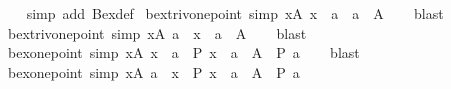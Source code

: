 \begin{isabellebody}
{}\isanewline
%
\isadelimproof
\ \ %
\endisadelimproof
%
\isatagproof
{}\isamarkupfalse%
\ {\isacharparenleft}{\kern0pt}simp\ add{\isacharcolon}{\kern0pt}\ Bex{\isacharunderscore}{\kern0pt}def{\isacharparenright}{\kern0pt}%
\endisatagproof
{\isafoldproof}%
%
\isadelimproof
\isanewline
%
\endisadelimproof
\isanewline
{}\isamarkupfalse%
\ bex{\isacharunderscore}{\kern0pt}triv{\isacharunderscore}{\kern0pt}one{\isacharunderscore}{\kern0pt}point{}\ {\isacharbrackleft}{\kern0pt}simp{\isacharbrackright}{\kern0pt}{\isacharcolon}{\kern0pt}\ {\isachardoublequoteopen}{\isacharparenleft}{\kern0pt}{\isasymexists}x{\isasymin}A{\isachardot}{\kern0pt}\ x\ {\isacharequal}{\kern0pt}\ a{\isacharparenright}{\kern0pt}\ {\isasymlongleftrightarrow}\ a\ {\isasymin}\ A{\isachardoublequoteclose}\isanewline
%
\isadelimproof
\ \ %
\endisadelimproof
%
\isatagproof
{}\isamarkupfalse%
\ blast%
\endisatagproof
{\isafoldproof}%
%
\isadelimproof
\isanewline
%
\endisadelimproof
\isanewline
{}\isamarkupfalse%
\ bex{\isacharunderscore}{\kern0pt}triv{\isacharunderscore}{\kern0pt}one{\isacharunderscore}{\kern0pt}point{}\ {\isacharbrackleft}{\kern0pt}simp{\isacharbrackright}{\kern0pt}{\isacharcolon}{\kern0pt}\ {\isachardoublequoteopen}{\isacharparenleft}{\kern0pt}{\isasymexists}x{\isasymin}A{\isachardot}{\kern0pt}\ a\ {\isacharequal}{\kern0pt}\ x{\isacharparenright}{\kern0pt}\ {\isasymlongleftrightarrow}\ a\ {\isasymin}\ A{\isachardoublequoteclose}\isanewline
%
\isadelimproof
\ \ %
\endisadelimproof
%
\isatagproof
{}\isamarkupfalse%
\ blast%
\endisatagproof
{\isafoldproof}%
%
\isadelimproof
\isanewline
%
\endisadelimproof
\isanewline
{}\isamarkupfalse%
\ bex{\isacharunderscore}{\kern0pt}one{\isacharunderscore}{\kern0pt}point{}\ {\isacharbrackleft}{\kern0pt}simp{\isacharbrackright}{\kern0pt}{\isacharcolon}{\kern0pt}\ {\isachardoublequoteopen}{\isacharparenleft}{\kern0pt}{\isasymexists}x{\isasymin}A{\isachardot}{\kern0pt}\ x\ {\isacharequal}{\kern0pt}\ a\ {\isasymand}\ P\ x{\isacharparenright}{\kern0pt}\ {\isasymlongleftrightarrow}\ a\ {\isasymin}\ A\ {\isasymand}\ P\ a{\isachardoublequoteclose}\isanewline
%
\isadelimproof
\ \ %
\endisadelimproof
%
\isatagproof
{}\isamarkupfalse%
\ blast%
\endisatagproof
{\isafoldproof}%
%
\isadelimproof
\isanewline
%
\endisadelimproof
\isanewline
{}\isamarkupfalse%
\ bex{\isacharunderscore}{\kern0pt}one{\isacharunderscore}{\kern0pt}point{}\ {\isacharbrackleft}{\kern0pt}simp{\isacharbrackright}{\kern0pt}{\isacharcolon}{\kern0pt}\ {\isachardoublequoteopen}{\isacharparenleft}{\kern0pt}{\isasymexists}x{\isasymin}A{\isachardot}{\kern0pt}\ a\ {\isacharequal}{\kern0pt}\ x\ {\isasymand}\ P\ x{\isacharparenright}{\kern0pt}\ {\isasymlongleftrightarrow}\ a\ {\isasymin}\ A\ {\isasymand}\ P\ a{\isachardoublequoteclose}\isanewline

\end{isabellebody}
